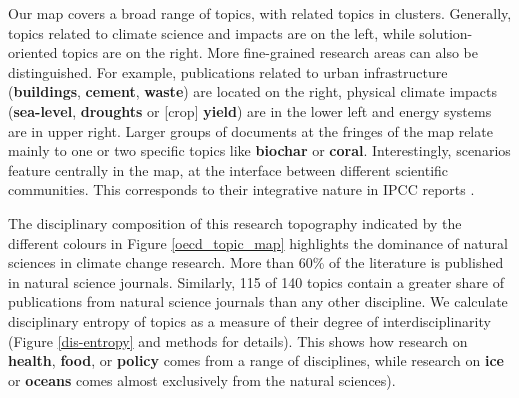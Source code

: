 \documentclass{article}
\begin{document}
\begin{linenumbers}
		
		
		Our map covers a broad range of topics, with related topics in clusters. Generally, topics related to climate science and impacts are on the left, while solution-oriented topics are on the right. More fine-grained research areas can also be distinguished. For example, publications related to urban infrastructure (\textbf{buildings}, \textbf{cement}, \textbf{waste}) are located on the right, physical climate impacts (\textbf{sea-level}, \textbf{droughts}  or [crop] \textbf{yield}) are in the lower left and energy systems are in upper right. Larger groups of documents at the fringes of the map relate mainly to one or two specific topics like \textbf{biochar} or \textbf{coral}. Interestingly, scenarios feature centrally in the map, at the interface between different scientific communities. This corresponds to their integrative nature in IPCC reports \cite{Moss2010}. %
		
		
		The disciplinary composition of this research topography indicated by the different colours in Figure \ref{oecd_topic_map} highlights the dominance of natural sciences in climate change research. More than 60\% of the literature is published in natural science journals. Similarly, 115 of 140 topics contain a greater share of publications from natural science journals than any other discipline. We calculate disciplinary entropy of topics as a measure of their degree of interdisciplinarity (Figure \ref{dis-entropy} and methods for details). This shows how research on \textbf{health}, \textbf{food}, or \textbf{policy} comes from a range of disciplines, while research on \textbf{ice} or \textbf{oceans} comes almost exclusively from the natural sciences). 
		

\end{linenumbers}
\end{document}
